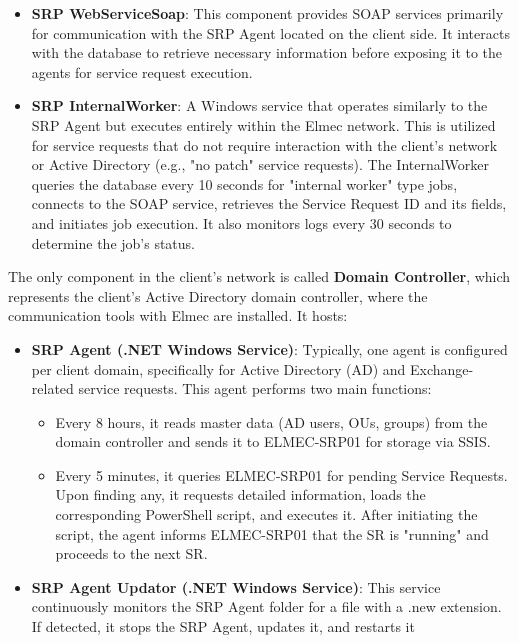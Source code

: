 \begin{itemize}
    \begin{itemize}
        \item \textbf{SRP WebServiceSoap}: This component provides SOAP services primarily for communication with the SRP Agent located on the client side. It interacts with the database to retrieve necessary information before exposing it to the agents for service request execution.
        \item \textbf{SRP InternalWorker}: A Windows service that operates similarly to the SRP Agent but executes entirely within the Elmec network. This is utilized for service requests that do not require interaction with the client's network or Active Directory (e.g., "no patch" service requests). The InternalWorker queries the database every 10 seconds for "internal worker" type jobs, connects to the SOAP service, retrieves the Service Request ID and its fields, and initiates job execution. It also monitors logs every 30 seconds to determine the job's status.
    \end{itemize}
\end{itemize}

The only component in the client's network is called \textbf{Domain Controller}, which represents the client's Active Directory domain controller, where the communication tools with Elmec are installed. It hosts:
\begin{itemize}
    \item \textbf{SRP Agent (.NET Windows Service)}: Typically, one agent is configured per client domain, specifically for Active Directory (AD) and Exchange-related service requests. This agent performs two main functions:
    \begin{itemize}
        \item Every 8 hours, it reads master data (AD users, OUs, groups) from the domain controller and sends it to ELMEC-SRP01 for storage via SSIS.
        \item Every 5 minutes, it queries ELMEC-SRP01 for pending Service Requests. Upon finding any, it requests detailed information, loads the corresponding PowerShell script, and executes it. After initiating the script, the agent informs ELMEC-SRP01 that the SR is "running" and proceeds to the next SR.
    \end{itemize}
    
    \item \textbf{SRP Agent Updator (.NET Windows Service)}: This service continuously monitors the SRP Agent folder for a file with a .new extension. If detected, it stops the SRP Agent, updates it, and restarts it
\end{itemize}

